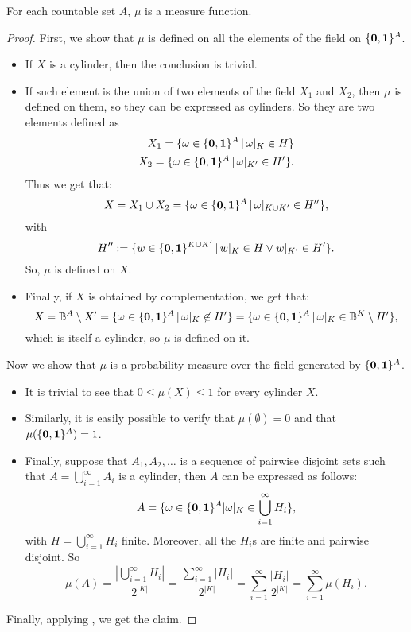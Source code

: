 \begin{remark}
  \label{rem:mumeas}
  For each countable set $A$, $\mu$ is a measure function.
\end{remark}
\begin{proof}
  First, we show that $\mu$ is defined on all the elements of the field on $\{\mathbf{0}, \mathbf{1}\}^A$.
  \begin{itemize}
    \item If $X$ is a cylinder, then the conclusion is trivial.
    \item If such element is the union of two elements of the field $X_1$ and $X_2$,
    then $\mu$ is defined on them, so they can be expressed as cylinders.
    So they are two elements defined as
    \begin{align*}
      X_1=\{\omega \in \{\mathbf{0}, \mathbf{1}\}^A\, |\, \omega|_K \in H\}\\
      X_2=\{\omega \in \{\mathbf{0}, \mathbf{1}\}^A\, |\, \omega|_{K'} \in H'\}.
    \end{align*}
    Thus we get that:
    $$
    X = X_1 \cup X_2 = \{\omega \in \{\mathbf{0}, \mathbf{1}\}^A\, |\, \omega|_{K \cup K'} \in H''\},
    $$
    with
    $$
    H'':=\{w \in \{\mathbf{0}, \mathbf{1}\}^{K\cup K'}\, |\, w|_K \in H \lor w|_{K'} \in H'\}.
    $$
    So, $\mu$ is defined on $X$.
    \item Finally, if $X$ is obtained by complementation, we get that:
    $$
    X = \mathbb{B}^A \setminus X'= \{\omega \in \{\mathbf{0}, \mathbf{1}\}^A\, |\, \omega|_{K}\not  \in H'\} = \{\omega \in \{\mathbf{0}, \mathbf{1}\}^A\, |\, \omega|_{K} \in \mathbb{B}^K \setminus H'\},
    $$
    which is itself a cylinder, so $\mu$ is defined on it.
  \end{itemize}
  Now we show that $\mu$ is a probability measure over the field generated by
  $\{\mathbf{0}, \mathbf{1}\}^A$.
  \begin{itemize}
    \item It is trivial to see that $0 \le \mu(X)\le 1$ for every cylinder $X$.
    \item Similarly, it is easily possible to verify that $\mu(\emptyset)=0$
    and that $\mu (\{\mathbf{0}, \mathbf{1}\}^A)=1$.
    \item Finally, suppose that $A_1, A_2,\ldots$ is a sequence of pairwise
    disjoint sets such that
    $A=\bigcup_{i = 1}^\infty A_i$ is a cylinder, then $A$ can be expressed as follows:
    $$
    A = \{\omega \in \{\mathbf{0}, \mathbf{1}\}^A | \omega|_K \in \bigcup_{i=1}^\infty H_i\},
    $$
    with $H= \bigcup_{i=1}^\infty H_i$ finite. Moreover,
    all the $H_i$s are finite and pairwise disjoint.
    So
    $$
    \mu(A) = \frac{|\bigcup_{i=1}^\infty H_i|}{2^{|K|}}=\frac{\sum_{i=1}^\infty|H_i|}{2^{|K|}}=\sum_{i=1}^\infty\frac{|H_i|}{2^{|K|}}=\sum_{i=1}^\infty\mu(H_i).
    $$
  \end{itemize}
  Finally, applying \cite[Theorem 3.1]{Billingsley}, we get the claim.
\end{proof}

